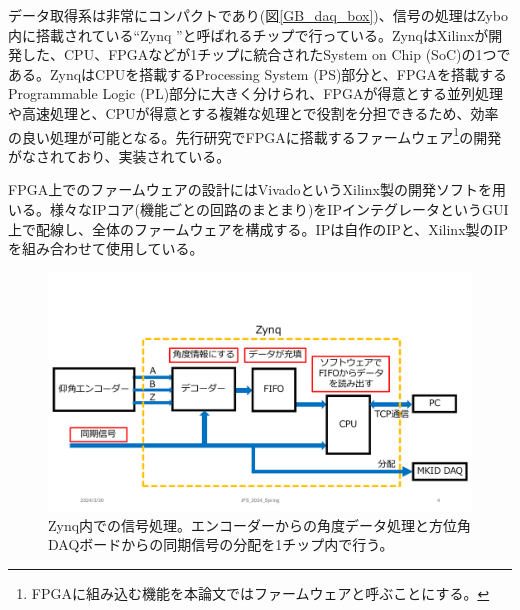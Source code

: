 データ取得系は非常にコンパクトであり(図\ref{GB_daq_box})、信号の処理はZybo内に搭載されている``Zynq \cite{Zynq}''と呼ばれるチップで行っている。ZynqはXilinxが開発した、CPU、FPGAなどが1チップに統合されたSystem on Chip (SoC)の1つである。ZynqはCPUを搭載するProcessing System (PS)部分と、FPGAを搭載するProgrammable Logic (PL)部分に大きく分けられ、FPGAが得意とする並列処理や高速処理と、CPUが得意とする複雑な処理とで役割を分担できるため、効率の良い処理が可能となる。先行研究でFPGAに搭載するファームウェア\footnote{FPGAに組み込む機能を本論文ではファームウェアと呼ぶことにする。}の開発がなされており、実装されている。


FPGA上でのファームウェアの設計にはVivado\cite{Vivado}というXilinx製の開発ソフトを用いる。様々なIPコア(機能ごとの回路のまとまり)をIPインテグレータというGUI上で配線し、全体のファームウェアを構成する。IPは自作のIPと、Xilinx製のIPを組み合わせて使用している。

\begin{figure}[htbp]
  \centering
  \includegraphics[width=1.0\columnwidth]{4_elDAQ/figs/zynq_flow.pdf}
  \caption{Zynq内での信号処理。エンコーダーからの角度データ処理と方位角DAQボードからの同期信号の分配を1チップ内で行う。}
  \label{zynq_flow}
\end{figure}

